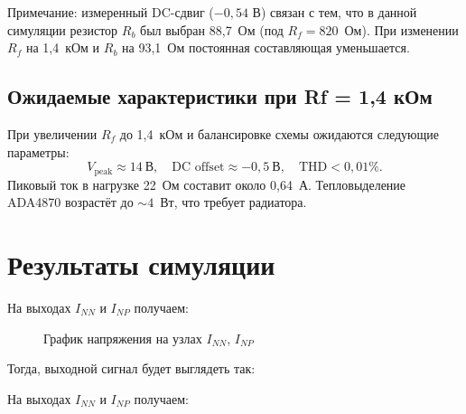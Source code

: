 \documentclass[a4paper, 12pt]{article}
\begin{document}
Примечание: измеренный DC-сдвиг (\(-0{,}54\) В) связан с тем, что
в данной симуляции резистор \(R_b\) был выбран 88{,}7~Ом
(под \(R_f=820\)~Ом). При изменении \(R_f\) на 1{,}4~кОм и \(R_b\)
на 93{,}1~Ом постоянная составляющая уменьшается.

\subsection{Ожидаемые характеристики при Rf = 1,4 кОм}

При увеличении \(R_f\) до 1{,}4~кОм и балансировке схемы
ожидаются следующие параметры:
\[
    V_{\text{peak}} \approx 14\ \text{В},\quad
    \text{DC offset} \approx -0{,}5\ \text{В},\quad
    \text{THD} < 0{,}01\%.
\]
Пиковый ток в нагрузке 22~Ом составит около 0{,}64~А.
Тепловыделение ADA4870 возрастёт до \(\sim 4\)~Вт,
что требует радиатора.

\section{Результаты симуляции}

\par На выходах \(I_{NN}\) и \(I_{NP}\) получаем:
\begin{figure}[H]
\centering
{}
\caption{График напряжения на узлах \(I_{NN}\), \(I_{NP}\)}
\end{figure}

\par Тогда, выходной сигнал будет выглядеть так:

\par На выходах \(I_{NN}\) и \(I_{NP}\) получаем:
\end{document}
